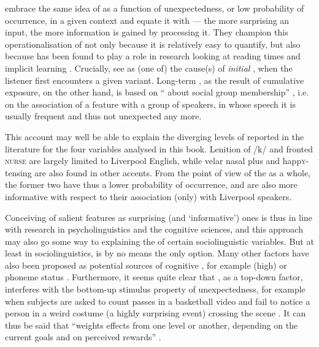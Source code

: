 \textcite[cf.][37]{jaegeretal2017} embrace the same idea of  as a function of unexpectedness, or low probability of occurrence, in a given context and equate it with  --- the more surprising an input, the more information is gained by processing it.
They champion this operationalisation of  not only because it is relatively easy to quantify, but also because  has been found to play a role in research looking at reading times and implicit learning \parencite[cf.][37]{jaegeretal2017}.
Crucially, \citeauthor{jaegeretal2017} see  as (one of) the cause(s) of \emph{initial} , when the listener first encounters a given variant.
Long-term , as the result of cumulative exposure, on the other hand, is based on \enquote{ about social group membership} \parencite[38]{jaegeretal2017}, i.e. on the association of a feature with a group of speakers, in whose speech it is usually frequent and thus not unexpected any more.

This account may well be able to explain the diverging levels of  reported in the literature for the four variables analysed in this book.
Lenition of /k/ and fronted \textsc{nurse} are largely limited to Liverpool English, while velar nasal plus and happ\textsc{y}-tensing are also found in other accents.
From the point of view of the  as a whole, the former two have thus a lower probability of occurrence, and are also more informative with respect to their association (only) with Liverpool speakers.

Conceiving of salient features as surprising (and `informative') ones is thus in line with research in psycholinguistics and the cognitive sciences, and this approach may also go some way to explaining the  of certain sociolinguistic variables. 
But at least in sociolinguistics,  is by no means the only option.
Many other factors have also been proposed as potential sources of cognitive , for example (high)  or phoneme status \parencite[cf.][8]{auer2014}.
Furthermore, it seems quite clear that , as a top-down factor, interferes with the bottom-up stimulus property of unexpectedness, for example when subjects are asked to count passes in a basketball video and fail to notice a person in a weird costume (a highly surprising event) crossing the scene \parencite[cf.][8]{zarconeetal2017}.
It can thus be said that  \enquote{weights  effects from one level or another, depending on the current goals and on perceived rewards} \parencite[8]{zarconeetal2017}.


